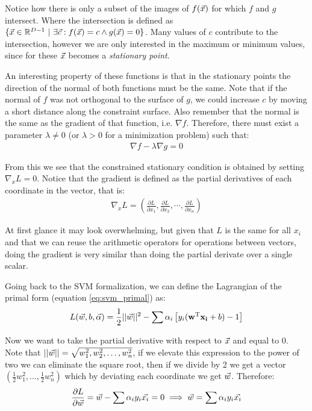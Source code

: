 Notice how there is only a subset of the images of $f(\vec{x})$ for which $f$ and $g$ inter\-sect. Where the intersection is defined as $\{\vec{x} \in \mathbb{R}^{D-1}\ |\ \exists \vec{c} : f(\vec{x}) = c \land g(\vec{x}) = 0\}$. Many values of $c$ contribute to the intersection, however we are only interested in the maximum or minimum values, since for these $\vec{x}$ becomes a \emph{stationary point}.

An interesting property of these functions is that in the stationary points the di\-rec\-tion of the normal of both functions must be the same. Note that if the normal of $f$ was not orthogonal to the surface of $g$, we could increase $c$ by moving a short distance along the constraint surface. Also remember that the normal is the same as the gradient of that function, i.e. $\nabla f$. Therefore, there must exist a parameter $\lambda \neq 0$ (or $\lambda > 0$ for a minimization problem) such that:
\begin{align}
    \nabla f - \lambda \nabla g = 0
\end{align}

From this we see that the constrained stationary condition is obtained by setting $\nabla_x L = 0$. Notice that the gradient is defined as the partial derivatives of each coordinate in the vector, that is:
\begin{align*}
    \nabla_x L = \left( \frac{\partial L}{\partial x_1}, \frac{\partial L}{\partial x_2}, \cdots, \frac{\partial L}{\partial x_n} \right)
\end{align*}

At first glance it may look overwhelming, but given that $L$ is the same for all $x_i$ and that we can reuse the arithmetic operators for operations between vectors, doing the gradient is very similar than doing the partial derivate over a single scalar. 

Going back to the SVM formalization, we can define the Lagrangian of the primal form (equation \ref{eq:svm_primal}) as:
\begin{align}\label{eq:svm_lagrangian_from_primal}
    L(\vec{w}, b, \vec{\alpha}) = \frac{1}{2} ||\vec{w}||^2 - \sum \alpha_i \left[ y_i (\mathbf{w}^{\text{T}} \mathbf{x_i} + b) - 1\right]
\end{align}

Now we want to take the partial derivative with respect to $\vec{x}$ and equal to 0. Note that $||\vec{w}|| = \sqrt{w_1^2, w_2^2, \dots, w_n^2}$, if we elevate this expression to the power of two we can eliminate the square root, then if we divide by 2 we get a vector $\left( \frac{1}{2} w_1^2, \dots, \frac{1}{2} w_n^2 \right)$ which by deviating each coordinate we get $\vec{w}$. Therefore:
\begin{align}\label{eq:svm_representer}
    \frac{\partial L}{\partial \vec{w}} = \vec{w} - \sum \alpha_i y_i \vec{x_i} = 0 \implies \vec{w} = \sum \alpha_i y_i \vec{x_i}
\end{align}

